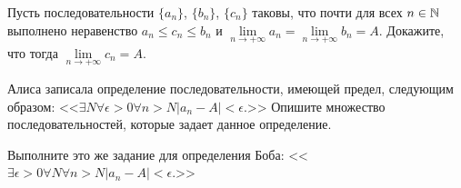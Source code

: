 \documentclass[a4paper, 12pt, num=30]{listok}
\begin{document}
\begin{problem}
    Пусть последовательности $\{a_n\}$, $\{b_n\}$, $\{c_n\}$ таковы, что почти для всех $n \in \mathbb{N}$ выполнено неравенство
    $a_n \le c_n \le b_n$ и $\lim\limits_{n\to+\infty} a_n = \lim\limits_{n\to+\infty} b_n = A$.
    Докажите, что тогда $\lim\limits_{n\to+\infty} c_n = A$.
\end{problem}
\begin{problem}
\begin{probparts}
    \item Алиса записала определение последовательности, имеющей предел, следующим образом:
        <<$
            \exists{N}\forall{\epsilon > 0}\forall{n > N} |a_n - A| < \epsilon.
        $>>
        Опишите множество последовательностей, которые задает данное определение.
    \item Выполните это же задание для определения Боба:
        <<$
            \exists{\epsilon > 0} \forall N \forall{n > N} |a_n - A| < \epsilon.
        $>>
\end{probparts}
\end{problem}
\end{document}
